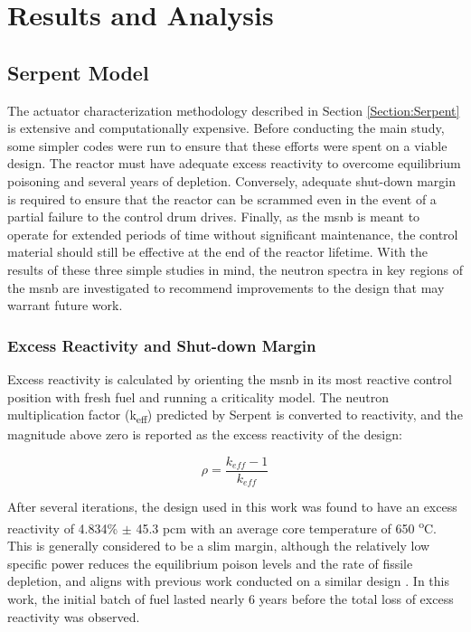 \chapter{Results and Analysis}
\label{Chapter:Results}

\section{Serpent Model}
The actuator characterization methodology described in Section \ref{Section:Serpent} is extensive and computationally expensive. Before conducting the main study, some simpler codes were run to ensure that these efforts were spent on a viable design. The reactor must have adequate excess reactivity to overcome equilibrium poisoning and several years of depletion. Conversely, adequate shut-down margin is required to ensure that the reactor can be scrammed even in the event of a partial failure to the control drum drives. Finally, as the \acs{msnb} is meant to operate for extended periods of time without significant maintenance, the control material should still be effective at the end of the reactor lifetime. With the results of these three simple studies in mind, the neutron spectra in key regions of the \acs{msnb} are investigated to recommend improvements to the design that may warrant future work.

\subsection{Excess Reactivity and Shut-down Margin}
Excess reactivity is calculated by orienting the \acs{msnb} in its most reactive control position with fresh fuel and running a criticality model. The neutron multiplication factor (k\textsubscript{eff}) predicted by Serpent is converted to reactivity, and the magnitude above zero is reported as the excess reactivity of the design: 

\begin{equation}
    \rho = \frac{k_{eff}-1}{k_{eff}}
\end{equation}

After several iterations, the design used in this work was found to have an excess reactivity of 4.834\% $\pm$ 45.3 pcm with an average core temperature of 650 \textsuperscript{o}C. This is generally considered to be a slim margin, although the relatively low specific power reduces the equilibrium poison levels and the rate of fissile depletion, and aligns with previous work conducted on a similar design \cite{PetersonMS}. In this work, the initial batch of fuel lasted nearly 6 years before the total loss of excess reactivity was observed.

